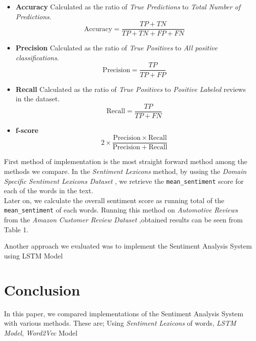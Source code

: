 \documentclass[11pt,a4paper]{article}
\begin{document}
\begin{itemize}
	\item \textbf{Accuracy}
		Calculated as the ratio of \textit{True Predictions} to  \textit{Total Number of Predictions}. 
		\begin{equation}
			\mathrm{Accuracy} = \frac{TP + TN}{TP + TN + FP + FN}
		\end{equation}

	
	\item \textbf{Precision}
		 Calculated as the ratio of \textit{True Positives} to  \textit{All positive classifications}.
		\begin{equation}
			\mathrm{Precision} =\frac{TP}{TP + FP}
		\end{equation}

	\item \textbf{Recall}
		 Calculated as the ratio of \textit{True Positives} to  \textit{Positive Labeled} reviews in the dataset. 
		\begin{equation}
			\mathrm{Recall} = \frac{TP}{TP + FN}
		\end{equation}
	\item \textbf{f-score}
	\begin{equation}
		2 \times \frac{\mathrm{Precision}\times\mathrm{Recall}}{\mathrm{Precision} + \mathrm{Recall}}
	\end{equation}
\end{itemize}

First method of implementation is the most straight forward method among the methods we compare. In the \textit{Sentiment Lexicons} method, by ussing the \textit{Domain Specific Sentiment Lexicons Dataset} \cite{hamilton2016inducing}, we retrieve the \texttt{mean\_sentiment} score for each of the words in the text. \\

Later on, we calculate the overall sentiment score as running total of the \texttt{mean\_sentiment} of each words. 
Running this method on \textit{Automotive Reviews} from the \textit{Amazon Customer Review Dataset} \cite{He_2016, mcauley2015imagebased},obtained results can be seen from Table 1.


Another approach we evaluated was to implement the Sentiment Analysis System using LSTM Model



\section{Conclusion}
In this paper, we compared implementations of the Sentiment Analysis System with various methods. These are; Using \textit{Sentiment Lexicons} of words, \textit{LSTM Model}, \textit{Word2Vec} Model\\
\end{document}
